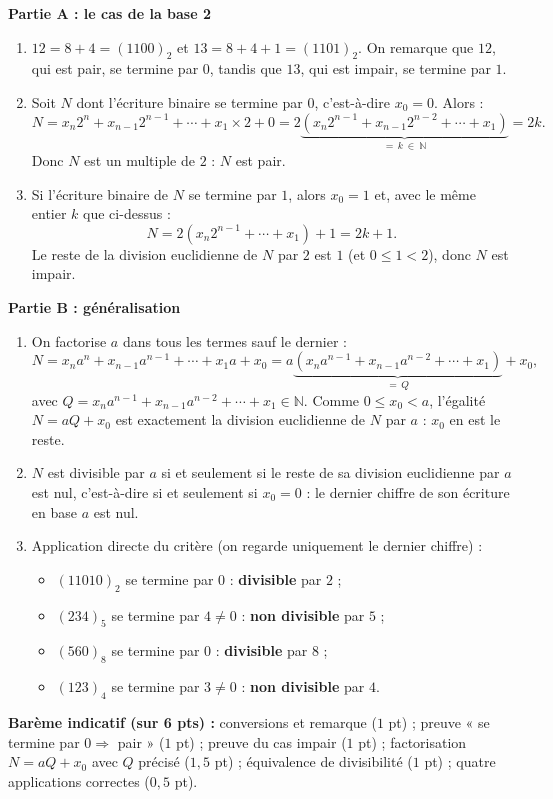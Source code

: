 \documentclass[11pt]{article}
\begin{document}
\begin{corrige}
\textbf{Partie A : le cas de la base 2}
\begin{enumerate}
\item $12 = 8 + 4 = (1100)_2$ et $13 = 8 + 4 + 1 = (1101)_2$. On remarque que $12$, qui est pair, se termine par $0$, tandis que $13$, qui est impair, se termine par $1$.
\item Soit $N$ dont l'écriture binaire se termine par $0$, c'est-à-dire $x_0 = 0$. Alors :
\[ N = x_n 2^n + x_{n-1} 2^{n-1} + \cdots + x_1 \times 2 + 0 = 2\underbrace{\left(x_n 2^{n-1} + x_{n-1} 2^{n-2} + \cdots + x_1\right)}_{=\,k\ \in\ \mathbb{N}} = 2k. \]
Donc $N$ est un multiple de $2$ : $N$ est pair.
\item Si l'écriture binaire de $N$ se termine par $1$, alors $x_0 = 1$ et, avec le même entier $k$ que ci-dessus :
\[ N = 2\left(x_n 2^{n-1} + \cdots + x_1\right) + 1 = 2k + 1. \]
Le reste de la division euclidienne de $N$ par $2$ est $1$ (et $0 \le 1 < 2$), donc $N$ est impair.
\end{enumerate}
\textbf{Partie B : généralisation}
\begin{enumerate}
\item On factorise $a$ dans tous les termes sauf le dernier :
\[ N = x_n a^n + x_{n-1} a^{n-1} + \cdots + x_1 a + x_0 = a\underbrace{\left(x_n a^{n-1} + x_{n-1} a^{n-2} + \cdots + x_1\right)}_{=\,Q} + x_0, \]
avec $Q = x_n a^{n-1} + x_{n-1} a^{n-2} + \cdots + x_1 \in \mathbb{N}$. Comme $0 \le x_0 < a$, l'égalité $N = aQ + x_0$ est exactement la division euclidienne de $N$ par $a$ : $x_0$ en est le reste.
\item $N$ est divisible par $a$ si et seulement si le reste de sa division euclidienne par $a$ est nul, c'est-à-dire si et seulement si $x_0 = 0$ : le dernier chiffre de son écriture en base $a$ est nul.
\item Application directe du critère (on regarde uniquement le dernier chiffre) :
\begin{itemize}
\item $(11010)_2$ se termine par $0$ : \textbf{divisible} par $2$ ;
\item $(234)_5$ se termine par $4 \neq 0$ : \textbf{non divisible} par $5$ ;
\item $(560)_8$ se termine par $0$ : \textbf{divisible} par $8$ ;
\item $(123)_4$ se termine par $3 \neq 0$ : \textbf{non divisible} par $4$.
\end{itemize}
\end{enumerate}
\textbf{Barème indicatif (sur 6 pts) :} conversions et remarque ($1$ pt) ; preuve « se termine par $0 \Rightarrow$ pair » ($1$ pt) ; preuve du cas impair ($1$ pt) ; factorisation $N = aQ + x_0$ avec $Q$ précisé ($1{,}5$ pt) ; équivalence de divisibilité ($1$ pt) ; quatre applications correctes ($0{,}5$ pt).


\end{corrige}
\end{document}
